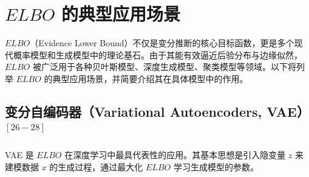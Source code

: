 \documentclass[final]{ws-ijseke}
\begin{document}
\section{$ELBO$ 的典型应用场景}
\hspace*{2em} $ELBO$（Evidence Lower Bound）不仅是变分推断的核心目标函数，更是多个现代概率模型和生成模型中的理论基石。由于其能有效逼近后验分布与边缘似然，$ELBO$ 被广泛用于各种贝叶斯模型、深度生成模型、聚类模型等领域。以下将列举 $ELBO$ 的典型应用场景，并简要介绍其在具体模型中的作用。
\subsection{变分自编码器（Variational Autoencoders, VAE）$^{[26-28]}$}
\hspace*{2em} VAE 是 $ELBO$ 在深度学习中最具代表性的应用。其基本思想是引入隐变量 $z$ 来建模数据 $x$ 的生成过程，通过最大化 $ELBO$ 学习生成模型的参数。
\end{document}
